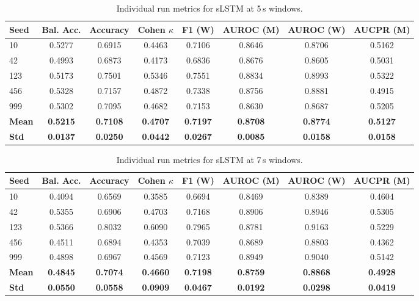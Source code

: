 \begin{table}[htbp]
\centering
\caption{Individual run metrics for sLSTM at 5\,s windows.}
\label{tab:app_metrics_slstm_5s}
\footnotesize
\setlength{\tabcolsep}{2.5pt}
\begin{tabular}{l | c | c | c | c | c | c | c}
\textbf{Seed} & \textbf{Bal. Acc.} & \textbf{Accuracy} & \textbf{Cohen \(\kappa\)} & \textbf{F1 (W)} & \textbf{AUROC (M)} & \textbf{AUROC (W)} & \textbf{AUCPR (M)} \\
\hline
10  & 0.5277 & 0.6915 & 0.4463 & 0.7106 & 0.8646 & 0.8706 & 0.5162 \\
42  & 0.4993 & 0.6873 & 0.4173 & 0.6836 & 0.8676 & 0.8605 & 0.5031 \\
123 & 0.5173 & 0.7501 & 0.5346 & 0.7551 & 0.8834 & 0.8993 & 0.5322 \\
456 & 0.5328 & 0.7157 & 0.4872 & 0.7338 & 0.8756 & 0.8881 & 0.4915 \\
999 & 0.5302 & 0.7095 & 0.4682 & 0.7153 & 0.8630 & 0.8687 & 0.5205 \\
\hline
\textbf{Mean} & \textbf{0.5215} & \textbf{0.7108} & \textbf{0.4707} & \textbf{0.7197} & \textbf{0.8708} & \textbf{0.8774} & \textbf{0.5127} \\
\textbf{Std} & \textbf{0.0137} & \textbf{0.0250} & \textbf{0.0442} & \textbf{0.0267} & \textbf{0.0085} & \textbf{0.0158} & \textbf{0.0158} \\
\hline
\end{tabular}
\setlength{\tabcolsep}{6pt}
\end{table}

\begin{table}[htbp]
\centering
\caption{Individual run metrics for sLSTM at 7\,s windows.}
\label{tab:app_metrics_slstm_7s}
\footnotesize
\setlength{\tabcolsep}{2.5pt}
\begin{tabular}{l | c | c | c | c | c | c | c}
\textbf{Seed} & \textbf{Bal. Acc.} & \textbf{Accuracy} & \textbf{Cohen \(\kappa\)} & \textbf{F1 (W)} & \textbf{AUROC (M)} & \textbf{AUROC (W)} & \textbf{AUCPR (M)} \\
\hline
10  & 0.4094 & 0.6569 & 0.3585 & 0.6694 & 0.8469 & 0.8389 & 0.4604 \\
42  & 0.5355 & 0.6906 & 0.4703 & 0.7168 & 0.8906 & 0.8946 & 0.5305 \\
123 & 0.5366 & 0.8032 & 0.6090 & 0.7965 & 0.8781 & 0.9163 & 0.5229 \\
456 & 0.4511 & 0.6894 & 0.4353 & 0.7039 & 0.8689 & 0.8803 & 0.4362 \\
999 & 0.4898 & 0.6967 & 0.4569 & 0.7123 & 0.8949 & 0.9040 & 0.5142 \\
\hline
\textbf{Mean} & \textbf{0.4845} & \textbf{0.7074} & \textbf{0.4660} & \textbf{0.7198} & \textbf{0.8759} & \textbf{0.8868} & \textbf{0.4928} \\
\textbf{Std} & \textbf{0.0550} & \textbf{0.0558} & \textbf{0.0909} & \textbf{0.0467} & \textbf{0.0192} & \textbf{0.0298} & \textbf{0.0419} \\
\hline
\end{tabular}
\setlength{\tabcolsep}{6pt}
\end{table}

